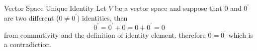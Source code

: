 \documentclass{standalone}
\begin{document}
\begin{theo*}{Vector Space Unique Identity}
  Let $ V$ be a vector space and suppose that $ 0 $ and $ 0 ^{\prime} $ are two different ($ 0 \neq  0 ^{\prime} $) identities, then 
  \[
  0 ^{\prime}  =  0 ^{\prime}   +  0  =  0  +  0 ^{\prime}  =  0
  \]
  from commutivity and the definition of identity element, therefore $ 0 =  0 ^{\prime} $ which is a contradiction.
\end{theo*}
\end{document}
